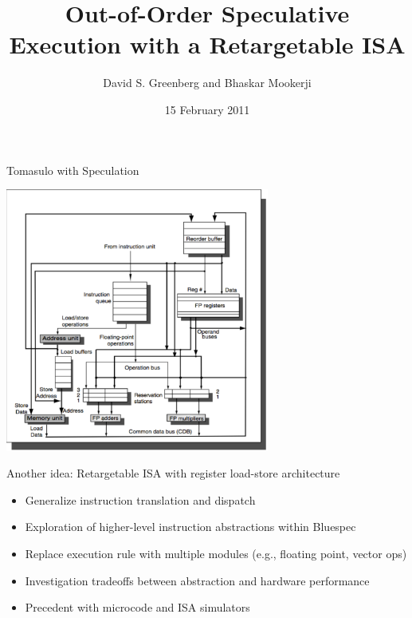 \documentclass{beamer}
\title[] %
{Out-of-Order Speculative Execution with a Retargetable ISA}
\author[] %
{David S. Greenberg and Bhaskar Mookerji}
\date[15 February 2011] %
{15 February 2011}
\begin{document}
\begin{frame}
  \titlepage
\end{frame}

\LogoOff

\begin{frame}{Tomasulo with Speculation}
	\begin{center}
		\includegraphics[width=0.65\textwidth]{tomasulo.pdf}
	\end{center}
\end{frame}

\begin{frame}{Another idea: Retargetable ISA with register load-store architecture}
	\begin{itemize}
		\item Generalize instruction translation and dispatch
		\item Exploration of higher-level instruction abstractions within Bluespec
		\item Replace execution rule with multiple modules (e.g., floating point, vector ops)
		\item Investigation tradeoffs between abstraction and hardware performance
		\item Precedent with microcode and ISA simulators
	\end{itemize}

\end{frame}
\end{document}
